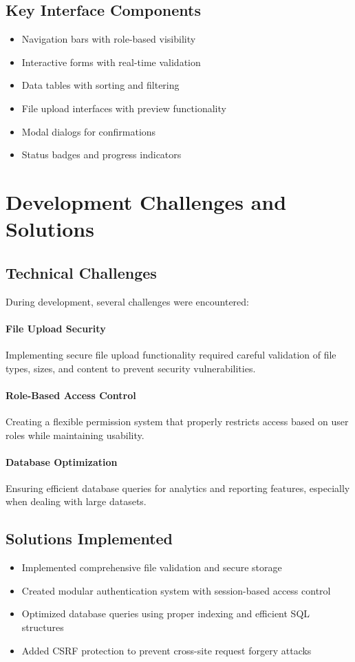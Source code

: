 \subsection{Key Interface Components}
\begin{itemize}
    \item Navigation bars with role-based visibility
    \item Interactive forms with real-time validation
    \item Data tables with sorting and filtering
    \item File upload interfaces with preview functionality
    \item Modal dialogs for confirmations
    \item Status badges and progress indicators
\end{itemize}

\section{Development Challenges and Solutions}

\subsection{Technical Challenges}
During development, several challenges were encountered:

\paragraph{File Upload Security}
Implementing secure file upload functionality required careful validation of file types, sizes, and content to prevent security vulnerabilities.

\paragraph{Role-Based Access Control}
Creating a flexible permission system that properly restricts access based on user roles while maintaining usability.

\paragraph{Database Optimization}
Ensuring efficient database queries for analytics and reporting features, especially when dealing with large datasets.

\subsection{Solutions Implemented}
\begin{itemize}
    \item Implemented comprehensive file validation and secure storage
    \item Created modular authentication system with session-based access control
    \item Optimized database queries using proper indexing and efficient SQL structures
    \item Added CSRF protection to prevent cross-site request forgery attacks
\end{itemize}

